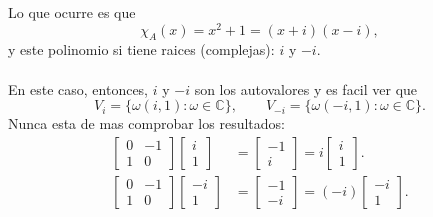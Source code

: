 \documentclass{article}
\theoremstyle{definition}
\theoremstyle{definition}
\theoremstyle{remark}
\begin{document}
Lo que ocurre es que \[
\chi_A(x)=x^2+1=(x+i)(x-i),
\]
y este polinomio si tiene raices (complejas): $i$ y $-i$.
\\\\
En este caso, entonces, $i$ y $-i$ son los autovalores y es facil ver que \[
  V_i=\{\omega(i,1): \omega \in \mathbb{C}\}, \quad \quad V_{-i} =\{\omega (-i,1) : \omega \in \mathbb{C} \}.
\]
Nunca esta de mas comprobar los resultados: \[
  \begin{aligned}
    \begin{bmatrix} 0 & -1 \\ 1 & 0 \end{bmatrix} \begin{bmatrix}i \\ 1 \end{bmatrix} &= \begin{bmatrix} -1 \\ i \end{bmatrix} = i \begin{bmatrix} i \\ 1 \end{bmatrix}. \\
    \begin{bmatrix} 0 & -1 \\ 1 & 0 \end{bmatrix} \begin{bmatrix}-i \\ 1 \end{bmatrix} &= \begin{bmatrix} -1 \\ -i \end{bmatrix} = (-i) \begin{bmatrix} -i \\ 1 \end{bmatrix}.
  \end{aligned}
\]
\pagebreak
\end{document}

